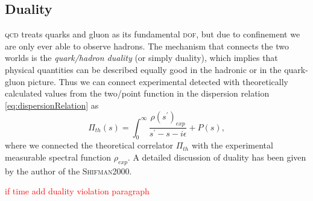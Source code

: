 \documentclass[../../index.tex]{subfiles}
\begin{document}
\subsection{Duality}
\textsc{qcd} treats quarks and gluon as its fundamental \textsc{dof}, but due to
confinement we are only ever able to observe hadrons. The mechanism that
connects the two worlds is the \textit{quark\-/hadron duality} (or simply
duality), which implies that physical quantities can be described equally good
in the hadronic or in the quark-gluon picture. Thus we can connect experimental
detected with theoretically calculated values from the two\-/point function in
the dispersion relation \cref{eq:dispersionRelation} as
\begin{equation}
  \Pi_{th}(s) = \int_0^\infty \frac{\rho(s^\prime)_{exp}}{s^\prime-s-i\epsilon} + P(s),
\end{equation}
where we connected the theoretical correlator $\Pi_{th}$ with the experimental
measurable spectral function $\rho_{exp}$. A detailed discussion of duality has
been given by the author of the \textsc{Shifman2000}.

\textcolor{red}{if time add duality violation paragraph}
\end{document}
